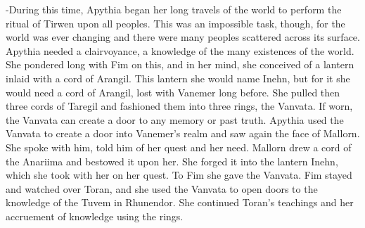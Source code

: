\documentclass[smalldemyvopaper,11pt,twoside,onecolumn,openright,extrafontsizes]{memoir}
\begin{document}
-During this time, Apythia began her long travels of the world to perform the ritual of Tirwen upon all peoples. This was an impossible task, though, for the world was ever changing and there were many peoples scattered across its surface. Apythia needed a clairvoyance, a knowledge of the many existences of the world. She pondered long with Fim on this, and in her mind, she conceived of a lantern inlaid with a cord of Arangil. This lantern she would name Inehn, but for it she would need a cord of Arangil, lost with Vanemer long before. She pulled then three cords of Taregil and fashioned them into three rings, the Vanvata. If worn, the Vanvata can create a door to any memory or past truth. Apythia used the Vanvata to create a door into Vanemer’s realm and saw again the face of Mallorn. She spoke with him, told him of her quest and her need. Mallorn drew a cord of the Anariima and bestowed it upon her. She forged it into the lantern Inehn, which she took with her on her quest. To Fim she gave the Vanvata. Fim stayed and watched over Toran, and she used the Vanvata to open doors to the knowledge of the Tuvem in Rhunendor. She continued Toran’s teachings and her accruement of knowledge using the rings.
\end{document}
